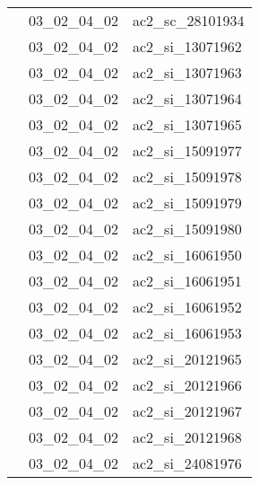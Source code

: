 \documentclass[12pt,titlepage,oneside]{book}
\begin{document}
\begin{supertabular}{|p{10cm}|c|p{15cm}|}
                    & 03\_02\_04\_02 & ac2\_sc\_28101934\\


                    & 03\_02\_04\_02 & ac2\_si\_13071962\\


                    & 03\_02\_04\_02 & ac2\_si\_13071963\\


                    & 03\_02\_04\_02 & ac2\_si\_13071964\\


                    & 03\_02\_04\_02 & ac2\_si\_13071965\\


                    & 03\_02\_04\_02 & ac2\_si\_15091977\\


                    & 03\_02\_04\_02 & ac2\_si\_15091978\\


                    & 03\_02\_04\_02 & ac2\_si\_15091979\\


                    & 03\_02\_04\_02 & ac2\_si\_15091980\\


                    & 03\_02\_04\_02 & ac2\_si\_16061950\\


                    & 03\_02\_04\_02 & ac2\_si\_16061951\\


                    & 03\_02\_04\_02 & ac2\_si\_16061952\\


                    & 03\_02\_04\_02 & ac2\_si\_16061953\\


                    & 03\_02\_04\_02 & ac2\_si\_20121965\\


                    & 03\_02\_04\_02 & ac2\_si\_20121966\\


                    & 03\_02\_04\_02 & ac2\_si\_20121967\\


                    & 03\_02\_04\_02 & ac2\_si\_20121968\\


                    & 03\_02\_04\_02 & ac2\_si\_24081976\\



\end{supertabular}
\end{document}

